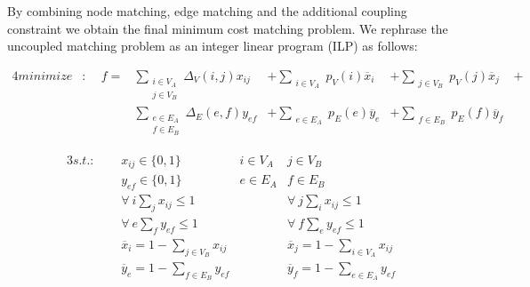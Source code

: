 		By combining node matching, edge matching and the additional coupling constraint we obtain the final minimum cost matching problem. We rephrase the uncoupled matching problem as an integer linear program (ILP) as follows:

		\begin{alignat}{4}
		minimize & : & \ \ f = &\sum_{ \substack{i \in V_A \\ j \in V_B }} \Delta_V(i,j) x_{ij}  &+  \sum_{ \substack{i \in V_A}} p_{V}(i) \overline{x}_{i} &+   \sum_{ \substack{j \in V_B}} p_{V}(j) \overline{x}_{j} & + \\ 
		 &   & \ \     &\sum_{ \substack{e \in E_A \\ f \in E_B }} \Delta_E(e,f) y_{ef}  &+  \sum_{ \substack{e \in E_A}} p_{E}(e) \overline{y}_{e} &+   \sum_{ \substack{f \in E_B}} p_{E}(f) \overline{y}_{f} & 
		\end{alignat}

		\begin{alignat}{3}
		s.t.: & \ \     & x_{ij} \in \{0,1\}   \quad \quad                                          & i \in V_A                                           & j \in V_B                                            \\
		& \ \     & y_{ef} \in \{0,1\}   \quad \quad                                          & e \in E_A                                           & f \in E_B                                             \\
		& \ \     & \forall \ i \sum_{j} x_{ij} \leq 1                                          &                                                     & \forall \ j \sum_{i} x_{ij} \leq     1                \\
		& \ \     & \forall \ e \sum_{f} y_{ef} \leq 1                                          &                                                     & \forall \ f \sum_{e} y_{ef} \leq 1                \\
		& \ \     & \overline{x}_{i} =  1 - \sum_{j \in V_B} x_{ij}                                &                                                     & \overline{x}_{j} =  1 - \sum_{i \in V_A} x_{ij}      \\          
		& \ \     & \overline{y}_{e} =  1 - \sum_{f \in E_B} y_{ef}                                &                                                     & \overline{y}_{f} =  1 - \sum_{e \in E_A} y_{ef}               
		\end{alignat}

